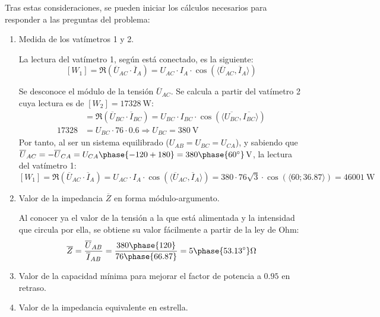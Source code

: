 Tras estas consideraciones, se pueden iniciar los cálculos necesarios
para responder a las preguntas del problema:
\begin{enumerate}
\item Medida de los vatímetros 1 y 2.
    
  La lectura del vatímetro 1, según está conectado, es la siguiente:
  \[ [W_1]=\Re(\overline{U}_{AC}\cdot \overline{I} _A)=U_{AC}\cdot I_A\cdot
    \cos(\langle \overline{U}_{AC}, \overline{I}_A \rangle)
  \]

  Se desconoce el módulo de la tensión $\overline{U}_{AC}$. Se calcula
  a partir del vatímetro 2 cuya lectura es de
  $[W_2]=\qty{17328}{\watt}$:
  \begin{align*}
 [W_2] &=\Re(\overline{U}_{BC} \cdot \overline{I}_{BC})=U_{BC}\cdot
    I_{BC}\cdot \cos(\langle \overline{U_{BC}},
         \overline{I_{BC}}\rangle)\\
    17328&=U_{BC}\cdot 76\cdot
    0.6\Rightarrow U_{BC}=\qty{380}{\volt}
  \end{align*}
  Por tanto, al ser un sistema equilibrado ($U_{AB}=U_{BC}=U_{CA}$), y
  sabiendo que
  $\overline{U}_{AC}=-\overline{U}_{CA}=U_{CA}\phase{-120+180}=\qty[parse-numbers=false]{380\phase{\ang{60}}}{\volt}$,
  la lectura del vatímetro 1:
  \[ [W_1]=\Re(\overline{U}_{AC}\cdot \overline{I}_A)=U_{AC}\cdot I_A\cdot
    \cos(\langle \overline{U}_{AC}, \overline{I}_A \rangle)=380\cdot
    76\sqrt{3}\cdot \cos(\langle60;36.87\rangle)=\qty{46001}{\watt}
  \]

\item Valor de la impedancia $\overline{Z}$ en forma módulo-argumento.

  Al conocer ya el valor de la tensión a la que está alimentada y la
  intensidad que circula por ella, se obtiene su valor fácilmente a
  partir de la ley de Ohm:
  \[
    \overline{Z}=\dfrac{\overline{U}_{AB}}{\overline{I}_{AB}}=\dfrac{380\phase{120}}{76\phase{66.87}}={5\phase{\ang{53.13}}}\unit{\ohm}
  \]

\item Valor de la capacidad mínima para mejorar el factor de potencia
  a $0.95$ en retraso.




\item Valor de la impedancia equivalente en estrella.


\end{enumerate}


